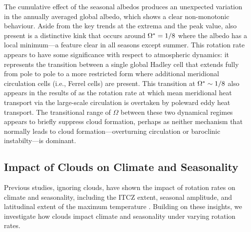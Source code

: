 The cumulative effect of the seasonal albedos produces an unexpected variation in the annually averaged global albedo, which shows a clear non-monotonic behaviour. Aside from the key trends at the extrema and the peak value, also present is a distinctive kink that occurs around $\Omega^*=1/8$ where the albedo has a local minimum---a feature clear in all seasons except summer. This rotation rate appears to have some significance with respect to atmospheric dynamics: it represents the transition between a single global Hadley cell that extends fully from pole to pole to a more restricted form where additional meridional circulation cells (i.e., Ferrel cells) are present. This transition at $\Omega^* \sim 1/8$ also appears in the results of \citet{kaspi2015-ATMOSPHERIC} as the rotation rate at which mean meridional heat transport via the large-scale circulation is overtaken by poleward eddy heat transport. The transitional range of $\Omega$ between these two dynamical regimes appears to briefly suppress cloud formation, perhaps as neither mechanism that normally leads to cloud formation---overturning circulation or baroclinic instabilty---is dominant.



\subsection{Impact of Clouds on Climate and Seasonality}\label{sec:results-seaonality}

Previous studies, ignoring clouds, have shown the impact of rotation rates on climate and seasonality, including the ITCZ extent, seasonal amplitude, and latitudinal extent of the maximum temperature \citep[e.g.,][]{faulk2017-Effects,geen2019-Processes,guendelman2022-Key}. Building on these insights, we investigate how clouds impact climate and seasonality under varying rotation rates. 


